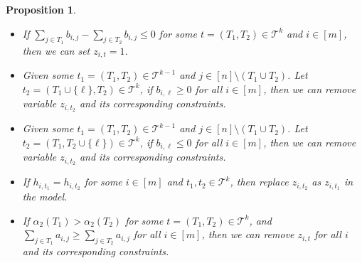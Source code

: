 \documentclass[11pt]{article}
\newtheorem{proposition}{Proposition}
\newcommand{\T}{\mathcal{T}}
\begin{document}
\begin{proposition}
	\begin{itemize}
		\item[\emph{(i)}] If $\sum_{j\in T_1} b_{i,j}  - \sum_{j\in T_2} b_{i,j} \leq 0$ for some $t = (T_1, T_2)\in \T^k$ and $i\in [m]$, then we can set $z_{i, t} = 1$.
		\item[\emph{(ii)}] Given some $t_1=(T_1, T_2) \in \T^{k-1}$ and $j \in [n]\setminus (T_1\cup T_2)$. Let $t_2 = (T_1\cup \{\ell\}, T_2) \in \T^k$, if $b_{i,\ell} \geq 0$ for all $ i\in [m]$, then we can remove variable $z_{i, {t_2}}$ and its corresponding constraints.
		\item[\emph{(iii)}]  Given some $t_1=(T_1, T_2) \in \T^{k-1}$ and $j \in [n]\setminus (T_1\cup T_2)$. Let $t_2 = (T_1, T_2\cup \{\ell\}) \in \T^k$, if $b_{i,\ell} \leq 0$ for all $ i\in [m]$, then we can remove variable $z_{i, {t_2}}$ and its corresponding constraints. 
		\item[\emph{(iv)}] If $h_{i,t_1} = h_{i, t_2}$ for some $i\in [m]$ and $t_1, t_2\in \T^k$, then replace $z_{i, t_2}$ as $z_{i, t_1}$ in the model.
		\item[\emph{(v)}] If $\alpha_2(T_1) > \alpha_2(T_2)$ for some $t = (T_1, T_2) \in \T^k$, and $\sum_{j\in T_1} a_{i,j} \geq \sum_{j\in T_2} a_{i,j}$ for all $i\in [m]$, then we can remove $z_{i,t}$ for all $i$ and its corresponding constraints.
	\end{itemize}
\end{proposition}
\end{document}
